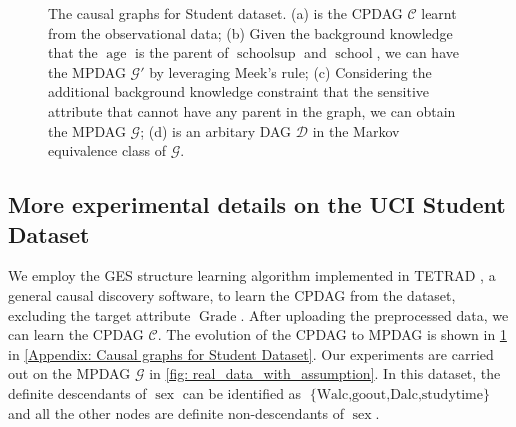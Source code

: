 \documentclass{article} %
\begin{document}
\begin{figure}[ht]
{ }
\caption{The causal graphs for Student dataset. (a) is the CPDAG $\mathcal{C}$ learnt from the observational data; (b) Given the background knowledge that the $\operatorname{age}$ is the parent of $\operatorname{schoolsup}$ and $\operatorname{school}$, we can have the MPDAG $\mathcal{G'}$ by leveraging Meek's rule; (c) Considering the additional background knowledge constraint that the sensitive attribute that cannot have any parent in the graph, we can obtain the MPDAG $\mathcal{G}$; (d) is an arbitary DAG $\mathcal{D}$ in the Markov equivalence class of $\mathcal{G}$.}
\label{fig: causal_graph_student}
\end{figure}


\subsection{More experimental details on the UCI Student Dataset} \label{Appendix: Training Details on Student Data}
We employ the GES structure learning algorithm  \citep{chickering2002learning} implemented in TETRAD \citep{ramsey2018tetrad}, a general causal discovery software, to learn the CPDAG from the dataset, excluding the target attribute $\operatorname{Grade}$. After uploading the preprocessed data, we can learn the CPDAG $\mathcal{C}$. The evolution of the CPDAG to MPDAG is shown in \cref{fig: causal_graph_student} in \cref{Appendix: Causal graphs for Student Dataset}. Our experiments are carried out on the MPDAG $\mathcal{G}$ in \cref{fig: real_data_with_assumption}.
In this dataset, the definite descendants of $\operatorname{sex}$ can be identified as $\operatorname{\{Walc, goout, Dalc, studytime\}}$ and all the other nodes are definite non-descendants of $\operatorname{sex}$.
\end{document}
